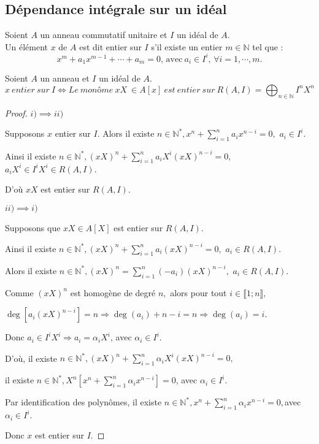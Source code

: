 \subsection{Dépendance intégrale sur un idéal}
\begin{madefinition}
	Soient $A$ un anneau commutatif unitaire et $I$ un idéal de $A$.\\ Un élément $x$ de $A$ est dit entier sur $I$ s'il existe un entier $m \in \mathbb{N}$ tel que : 
	\[ 	x^m + a_1 x^{m-1} + \cdots + a_m = 0\text{, avec} \ a_i \in I^i,\, \forall i=1, \cdots ,m. \]	
\end{madefinition}
\begin{maproposition}
	Soient $A$ un anneau et $I$ un idéal de $A$.
	\[ x \ entier \ sur \ I \Longleftrightarrow Le \ monôme \ xX \ \in A[x] \ est \ entier \ sur \ R(A, I) = \displaystyle \bigoplus_{n \in \mathbb{N}}{I^nX^n} \]
\end{maproposition}
\begin{proof}
	$i) \implies ii)$
	
	Supposons $x$ entier sur $I.$ Alors il existe $n\in \mathbb{N}^{\ast },x^{n}+\sum\limits_{i=1}^{n}a_{i}x^{n-i}=0,$ $a_{i}\in I^{i}.$
	
	Ainsi il existe $n\in \mathbb{N}^{\ast },(xX)^{n}+\sum\limits_{i=1}^{n}a_{i}X^{i}(xX)^{n-i}=0,$ $
	a_{i}X^{i}\in I^{i}X^{i}\in R(A,I).$
	
	D’où $xX$ est entier sur $R(A,I).$
	
	$ii)\implies i)$
	
	Supposons que  $xX\in A[X]$ est entier sur $R(A,I).$
	
	Ainsi il existe $n\in \mathbb{N}^{\ast },(xX)^{n}+\sum\limits_{i=1}^{n}a_{i}(xX)^{n-i}=0,$ $a_{i}\in R(A,I).
	$
	
	Alors il existe $n\in \mathbb{N}^{\ast },(xX)^{n}=\sum\limits_{i=1}^{n}(-a_{i})(xX)^{n-i},$ $a_{i}\in
	R(A,I).$
	
	Comme $(xX)^{n}$ est homogène de degré $n,$ alors pour tout $i\in \llbracket 1; n \rrbracket,$
	
	$\deg [a_{i}(xX)^{n-i}]=n\Rightarrow \deg (a_{i})+n-i=n\Rightarrow \deg
	(a_{i})=i.$
	
	Donc $a_{i}\in I^{i}X^{i}\Rightarrow a_{i}=\alpha _{i}X^{i}$, avec $\alpha
	_{i}\in I^{i}.$
	
	D’où, il existe $n\in \mathbb{N}^{\ast },(xX)^{n}+\sum\limits_{i=1}^{n}\alpha _{i}X^{i}(xX)^{n-i}=0,$
	
	il existe $n\in \mathbb{N}^{\ast },X^{n}[x^{n}+\sum\limits_{i=1}^{n}\alpha _{i}x^{n-i}]=0$, avec $\alpha _{i}\in I^{i}.$
	
	Par identification des polynômes, il existe $n\in \mathbb{N}^{\ast },x^{n}+\sum\limits_{i=1}^{n}\alpha _{i}x^{n-i}=0,$avec $\alpha_{i}\in I^{i}.$
	
	Donc $x$ est entier sur $I.$
\end{proof}
